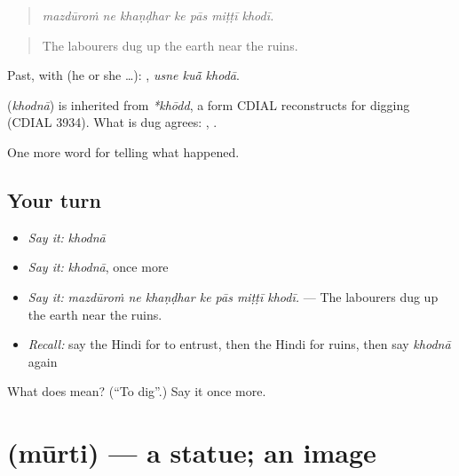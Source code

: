 \begin{quote}
      
\end{quote}

\begin{quote}
\emph{mazdūroṁ ne khaṇḍhar ke pās miṭṭī khodī.}
\end{quote}

\begin{quote}
The labourers dug up the earth near the ruins.
\end{quote}

Past, with  (he or she …):   , \emph{usne kuā̃ khodā}.

\begin{cousinweb}
\textbf{} (\emph{khodnā}) is inherited from \emph{*khōdd}, a form CDIAL reconstructs for digging (CDIAL 3934). What is dug agrees: \textbf{ }, \textbf{ }.
\end{cousinweb}

\begin{grammarlens}[title={What you've built}]
One more word for telling what happened.
\end{grammarlens}

\subsection*{Your turn}
\begin{itemize}
\raggedright
  \item \emph{Say it:} \emph{khodnā}
  \item \emph{Say it:} \emph{khodnā}, once more
  \item \emph{Say it:} \emph{mazdūroṁ ne khaṇḍhar ke pās miṭṭī khodī.} — The labourers dug up the earth near the ruins.
  \item \emph{Recall:} say the Hindi for to entrust, then the Hindi for ruins, then say \emph{khodnā} again
\end{itemize}

\begin{tcolorbox}[breakable,colback=teal!4,colframe=teal!35!black,title={Before you move on}]
What does  mean? (\textquotedblleft{}To dig\textquotedblright{}.) Say it once more.
\end{tcolorbox}
\section[\texorpdfstring{\hi{मूर्ति} (mūrti)}{मूर्ति (mūrti)}]{ (mūrti) — a statue; an image}

